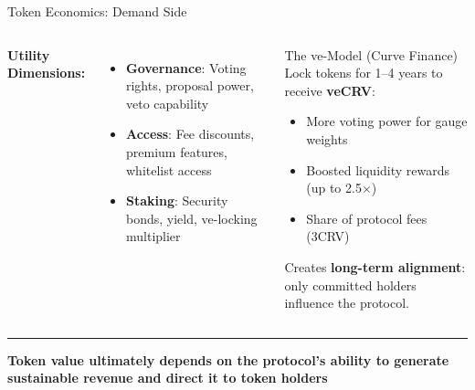 \documentclass[8pt,aspectratio=169]{beamer}
\newcommand{\bottomnote}[1]{\vfill\vspace{-2mm}\textcolor{mllavender2}{\rule{\textwidth}{0.4pt}}\vspace{1mm}\footnotesize\textbf{#1}}
\begin{document}
\begin{frame}{Token Economics: Demand Side}
\begin{columns}[T]
\vspace{2mm}
\textbf{\textcolor{mlpurple}{Utility Dimensions:}}\\[4pt]
\begin{itemize}\setlength\itemsep{4pt}
  \item \textbf{Governance}: Voting rights, proposal power, veto capability
  \item \textbf{Access}: Fee discounts, premium features, whitelist access
  \item \textbf{Staking}: Security bonds, yield, ve-locking multiplier
\end{itemize}
\vspace{4pt}
\begin{block}{The ve-Model (Curve Finance)}
\scriptsize Lock tokens for 1--4 years to receive \textbf{veCRV}:\\
\begin{itemize}\setlength\itemsep{2pt}
  \item More voting power for gauge weights
  \item Boosted liquidity rewards (up to 2.5$\times$)
  \item Share of protocol fees (3CRV)
\end{itemize}
Creates \textbf{long-term alignment}: only committed holders influence the protocol.
\end{block}
\end{columns}
\bottomnote{Token value ultimately depends on the protocol's ability to generate sustainable revenue and direct it to token holders}
\end{frame}
\end{document}
